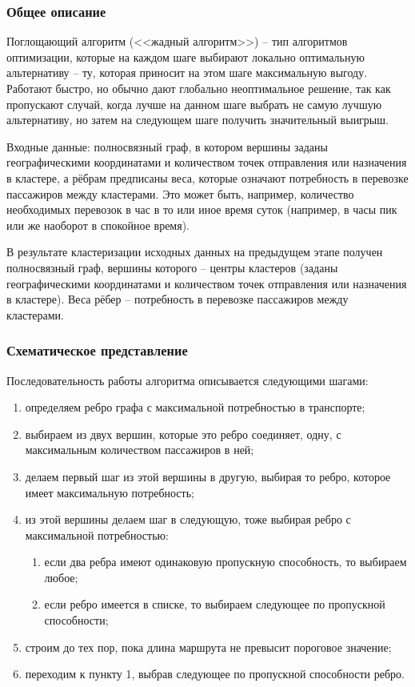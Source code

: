 \subsubsection{Общее описание}
Поглощающий алгоритм (<<жадный алгоритм>>) -- тип алгоритмов оптимизации, которые на каждом шаге выбирают 
локально оптимальную альтернативу -- ту, которая приносит на этом шаге максимальную выгоду. Работают быстро, 
но обычно дают глобально неоптимальное решение, так как пропускают случай, когда лучше на данном шаге 
выбрать не самую лучшую альтернативу, но затем на следующем шаге получить значительный выигрыш.

Входные данные: полносвязный граф, в котором вершины заданы географическими координатами и количеством 
точек отправления или назначения в кластере, а рёбрам предписаны веса, которые означают потребность в 
перевозке пассажиров между кластерами. Это может быть, например, количество необходимых перевозок в час в то 
или иное время суток (например, в часы пик или же наоборот в спокойное время).

В результате кластеризации исходных данных на предыдущем этапе получен полносвязный граф, вершины 
которого -- центры кластеров (заданы географическими координатами и количеством точек отправления или 
назначения в кластере). Веса рёбер -- потребность в перевозке пассажиров между кластерами. 

\subsubsection{Схематическое представление}
Последовательность работы алгоритма описывается следующими шагами:
\begin{enumerate}
    \item определяем ребро графа с максимальной потребностью в транспорте;
    \item выбираем из двух вершин, которые это ребро соединяет, одну, с максимальным количеством 
        пассажиров в ней;
    \item делаем первый шаг из этой вершины в другую, выбирая то ребро, которое имеет максимальную 
        потребность;
    \item из этой вершины делаем шаг в следующую, тоже выбирая ребро с максимальной потребностью:
    \begin{enumerate}
        \item если два ребра имеют одинаковую пропускную способность, то выбираем любое;
        \item если ребро имеется в списке, то выбираем следующее по пропускной способности;
    \end{enumerate}
    \item строим до тех пор, пока длина маршрута не превысит пороговое значение;
    \item переходим к пункту 1, выбрав следующее по пропускной способности ребро.
\end{enumerate}

